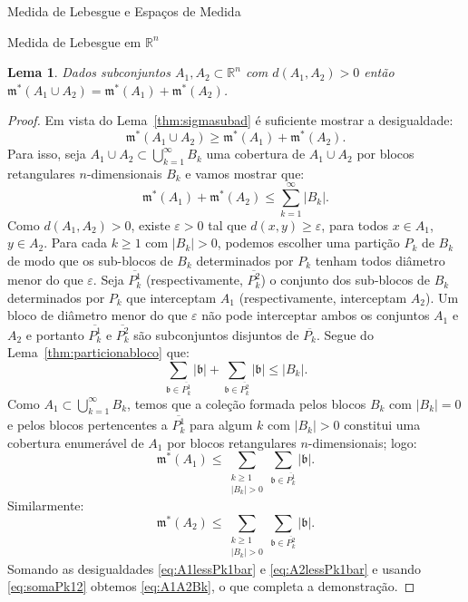 \documentclass[oneside,final,11pt]{amsbook}
\newcommand{\R}{\mathds R}
\newcommand{\leb}{\mathfrak m}
\theoremstyle{remark}\newtheorem{exercise}{Exercício}[chapter]
\theoremstyle{remark}\newtheorem{*exercise}[exercise]{\hbox to 0pt{\hskip 0pt minus 1fil*}Exercício}
\theoremstyle{definition}\newtheorem{exdefin}{Definição}[chapter]
\theoremstyle{plain}\newtheorem{teo}{Teorema}[section]
\theoremstyle{plain}\newtheorem{lem}[teo]{Lema}
\theoremstyle{plain}\newtheorem{prop}[teo]{Proposição}
\theoremstyle{plain}\newtheorem{cor}[teo]{Corolário}
\theoremstyle{definition}\newtheorem{defin}[teo]{Definição}
\theoremstyle{remark}\newtheorem{rem}[teo]{Observação}
\theoremstyle{definition}\newtheorem{notation}[teo]{Notação}
\theoremstyle{definition}\newtheorem{convention}[teo]{Convenção}
\theoremstyle{definition}\newtheorem{example}[teo]{Exemplo}
\numberwithin{section}{chapter}
\numberwithin{equation}{section}
\begin{document}
\begin{chapter}{Medida de Lebesgue e Espaços de Medida}
\begin{section}[Medida de Lebesgue em $\R^n$]{Medida de Lebesgue em ${\R^n}$}
\begin{lem}\label{eq:distanciapositiva}
Dados subconjuntos $A_1,A_2\subset\R^n$ com $d(A_1,A_2)>0$ então $\leb^*(A_1\cup A_2)=\leb^*(A_1)+\leb^*(A_2)$.
\end{lem}
\begin{proof}
Em vista do Lema~\ref{thm:sigmasubad} é suficiente mostrar a desigualdade:
\[\leb^*(A_1\cup A_2)\ge\leb^*(A_1)+\leb^*(A_2).\]
Para isso, seja $A_1\cup A_2\subset\bigcup_{k=1}^\infty B_k$
uma cobertura de $A_1\cup A_2$ por blocos retangulares $n$-dimensionais $B_k$ e vamos mostrar que:
\begin{equation}\label{eq:A1A2Bk}
\leb^*(A_1)+\leb^*(A_2)\le\sum_{k=1}^\infty\vert B_k\vert.
\end{equation}
Como $d(A_1,A_2)>0$, existe $\varepsilon>0$ tal que $d(x,y)\ge\varepsilon$, para todos $x\in A_1$, $y\in A_2$.
Para cada $k\ge1$ com $\vert B_k\vert>0$, podemos escolher uma partição $P_k$ de $B_k$ de modo que os sub-blocos
de $B_k$ determinados por $P_k$ tenham todos diâmetro menor do que $\varepsilon$. Seja $\overline{P_k^1}$ (respectivamente,
$\overline{P_k^2}$) o conjunto dos sub-blocos de $B_k$ determinados por $P_k$ que interceptam $A_1$ (respectivamente,
interceptam $A_2$). Um bloco de diâmetro menor do que $\varepsilon$ não pode interceptar ambos os conjuntos $A_1$ e $A_2$
e portanto $\overline{P_k^1}$ e $\overline{P_k^2}$ são subconjuntos disjuntos de $\overline{P_k}$. Segue do Lema~\ref{thm:particionabloco}
que:
\begin{equation}\label{eq:somaPk12}
\sum_{\mathfrak b\in\overline{P_k^1}}\vert\mathfrak b\vert+\sum_{\mathfrak b\in\overline{P_k^2}}\vert\mathfrak b\vert\le
\vert B_k\vert.
\end{equation}
Como $A_1\subset\bigcup_{k=1}^\infty B_k$, temos que a coleção formada pelos blocos $B_k$ com $\vert B_k\vert=0$ e pelos
blocos pertencentes a $\overline{P_k^1}$ para algum $k$ com $\vert B_k\vert>0$ constitui uma cobertura enumerável de $A_1$
por blocos retangulares $n$-dimensionais; logo:
\begin{equation}\label{eq:A1lessPk1bar}
\leb^*(A_1)\le\sum_{\substack{k\ge1\\\vert B_k\vert>0}}\sum_{\mathfrak b\in\overline{P_k^1}}\vert\mathfrak b\vert.
\end{equation}
Similarmente:
\begin{equation}\label{eq:A2lessPk1bar}
\leb^*(A_2)\le\sum_{\substack{k\ge1\\\vert B_k\vert>0}}\sum_{\mathfrak b\in\overline{P_k^2}}\vert\mathfrak b\vert.
\end{equation}
Somando as desigualdades \eqref{eq:A1lessPk1bar} e \eqref{eq:A2lessPk1bar} e usando \eqref{eq:somaPk12} obtemos
\eqref{eq:A1A2Bk}, o que completa a demonstração.
\end{proof}


\end{section}
\end{chapter}
\end{document}
